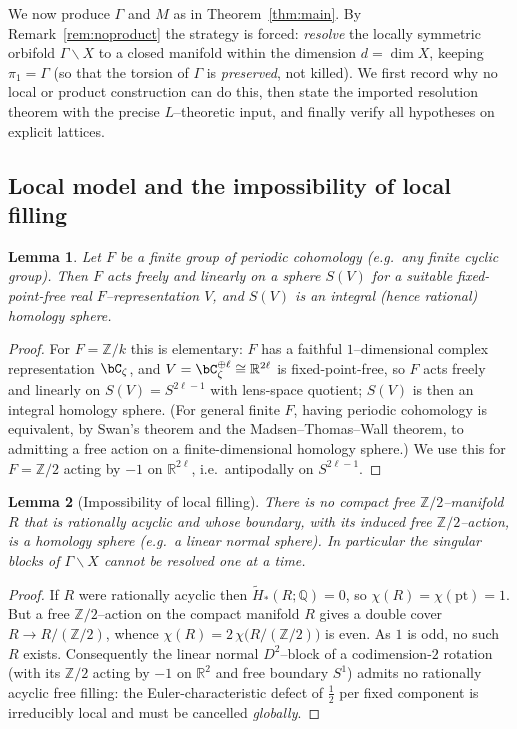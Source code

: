 \documentclass[12pt]{article}
\newcommand{\bR}{\mathbb{R}}
\newcommand{\bQ}{\mathbb{Q}}
\newcommand{\bZ}{\mathbb{Z}}
\newtheorem{lemma}{Lemma}
\theoremstyle{definition}
\begin{document}
We now produce $\Gamma$ and $M$ as in Theorem~\ref{thm:main}.  By
Remark~\ref{rem:noproduct} the strategy is forced: \emph{resolve} the locally
symmetric orbifold $\Gamma\backslash X$ to a closed manifold within the dimension
$d=\dim X$, keeping $\pi_1=\Gamma$ (so that the torsion of $\Gamma$ is
\emph{preserved}, not killed).  We first record why no local or product
construction can do this, then state the imported resolution theorem with the
precise $L$--theoretic input, and finally verify all hypotheses on explicit
lattices.

\subsection{Local model and the impossibility of local filling}

\begin{lemma}\label{lem:cyclicfree}
Let $F$ be a finite group of \emph{periodic cohomology} (e.g.\ any finite cyclic
group).  Then $F$ acts freely and linearly on a sphere $S(V)$ for a suitable
fixed-point-free real $F$--representation $V$, and $S(V)$ is an integral
\textup{(}hence rational\textup{)} homology sphere.
\end{lemma}

\begin{proof}
For $F=\bZ/k$ this is elementary: $F$ has a faithful $1$--dimensional complex
representation $\bC_\zeta$, and $V=\bC_\zeta^{\oplus\ell}\cong\bR^{2\ell}$ is
fixed-point-free, so $F$ acts freely and linearly on $S(V)=S^{2\ell-1}$ with
lens-space quotient; $S(V)$ is then an integral homology sphere.  (For general
finite $F$, having periodic cohomology is equivalent, by Swan's theorem and the
Madsen--Thomas--Wall theorem, to admitting a free action on a finite-dimensional
homology sphere.)  We use this for $F=\bZ/2$ acting by $-1$ on $\bR^{2\ell}$, i.e.\
antipodally on $S^{2\ell-1}$.
\end{proof}

\begin{lemma}[Impossibility of local filling]\label{lem:nolocalfill}
There is no compact \emph{free} $\bZ/2$--manifold $R$ that is rationally acyclic
and whose boundary, with its induced free $\bZ/2$--action, is a homology sphere
\textup{(}e.g.\ a linear normal sphere\textup{)}.  In particular the singular
blocks of $\Gamma\backslash X$ cannot be resolved one at a time.
\end{lemma}

\begin{proof}
If $R$ were rationally acyclic then $\widetilde H_*(R;\bQ)=0$, so
$\chi(R)=\chi(\mathrm{pt})=1$.  But a free $\bZ/2$--action on the compact manifold
$R$ gives a double cover $R\to R/(\bZ/2)$, whence
$\chi(R)=2\,\chi\bigl(R/(\bZ/2)\bigr)$ is even.  As $1$ is odd, no such $R$
exists.  Consequently the linear normal $D^{2}$--block of a codimension-$2$
rotation (with its $\bZ/2$ acting by $-1$ on $\bR^{2}$ and free boundary $S^{1}$)
admits no rationally acyclic free filling: the Euler-characteristic defect of
$\tfrac12$ per fixed component is irreducibly local and must be cancelled
\emph{globally}.
\end{proof}
\end{document}
